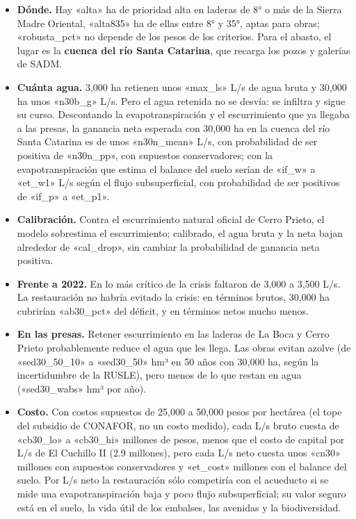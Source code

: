 \begin{itemize}
  \item \textbf{Dónde.} Hay «alta» ha de prioridad alta en laderas de 8° o más de la Sierra Madre Oriental, «alta835» ha de ellas entre 8° y 35°, aptas para obras; «robusta_pct» no depende de los pesos de los criterios. Para el abasto, el lugar es la \textbf{cuenca del río Santa Catarina}, que recarga los pozos y galerías de SADM.
  \item \textbf{Cuánta agua.} 3,000 ha retienen unos «max_ls» L/s de agua bruta y 30,000 ha unos «n30b_g» L/s. Pero el agua retenida no se desvía: se infiltra y sigue su curso. Descontando la evapotranspiración y el escurrimiento que ya llegaba a las presas, la ganancia neta esperada con 30,000 ha en la cuenca del río Santa Catarina es de unos «n30n_mean» L/s, con probabilidad de ser positiva de «n30n_pp», con supuestos conservadores; con la evapotranspiración que estima el balance del suelo serían de «if_w» a «et_w1» L/s según el flujo subsuperficial, con probabilidad de ser positivos de «if_p» a «et_p1».
  \item \textbf{Calibración.} Contra el escurrimiento natural oficial de Cerro Prieto, el modelo sobrestima el escurrimiento; calibrado, el agua bruta y la neta bajan alrededor de «cal_drop», sin cambiar la probabilidad de ganancia neta positiva.
  \item \textbf{Frente a 2022.} En lo más crítico de la crisis faltaron de 3,000 a 3,500 L/s. La restauración no habría evitado la crisis: en términos brutos, 30,000 ha cubrirían «ab30_pct» del déficit, y en términos netos mucho menos.
  \item \textbf{En las presas.} Retener escurrimiento en las laderas de La Boca y Cerro Prieto probablemente reduce el agua que les llega. Las obras evitan azolve (de «sed30_50_10» a «sed30_50» hm³ en 50 años con 30,000 ha, según la incertidumbre de la RUSLE), pero menos de lo que restan en agua («sed30_wabs» hm³ por año).
  \item \textbf{Costo.} Con costos supuestos de 25,000 a 50,000 pesos por hectárea (el tope del subsidio de CONAFOR, no un costo medido), cada L/s bruto cuesta de «cb30_lo» a «cb30_hi» millones de pesos, menos que el costo de capital por L/s de El Cuchillo II (2.9 millones), pero cada L/s neto cuesta unos «cn30» millones con supuestos conservadores y «et_cost» millones con el balance del suelo. Por L/s neto la restauración sólo competiría con el acueducto si se mide una evapotranspiración baja y poco flujo subsuperficial; su valor seguro está en el suelo, la vida útil de los embalses, las avenidas y la biodiversidad.

\end{itemize}
